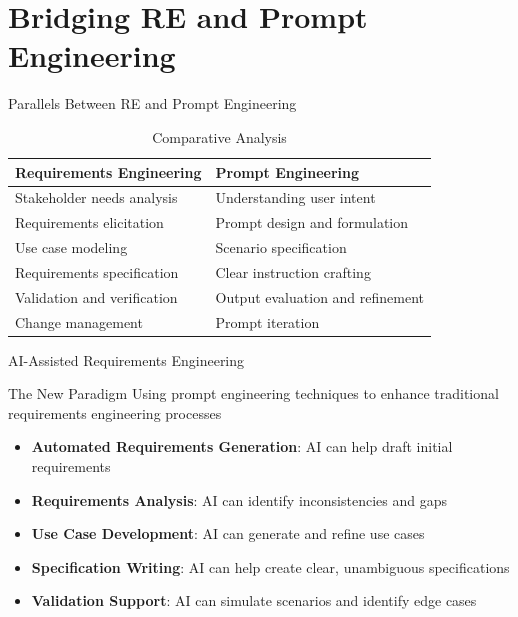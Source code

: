 \documentclass{beamer}
\begin{document}
\section{Bridging RE and Prompt Engineering}

\begin{frame}{Parallels Between RE and Prompt Engineering}
    \begin{table}
        \centering
        \begin{tabular}{p{}|p{}}
            \textbf{Requirements Engineering} & \textbf{Prompt Engineering} \\
            \hline
            Stakeholder needs analysis & Understanding user intent \\
            Requirements elicitation & Prompt design and formulation \\
            Use case modeling & Scenario specification \\
            Requirements specification & Clear instruction crafting \\
            Validation and verification & Output evaluation and refinement \\
            Change management & Prompt iteration \\
        \end{tabular}
        \caption{Comparative Analysis}
    \end{table}
\end{frame}

\begin{frame}{AI-Assisted Requirements Engineering}
    \begin{block}{The New Paradigm}
        Using prompt engineering techniques to enhance traditional requirements engineering processes
    \end{block}
    
    \begin{itemize}
        \item \textbf{Automated Requirements Generation}: AI can help draft initial requirements
        \item \textbf{Requirements Analysis}: AI can identify inconsistencies and gaps
        \item \textbf{Use Case Development}: AI can generate and refine use cases
        \item \textbf{Specification Writing}: AI can help create clear, unambiguous specifications
        \item \textbf{Validation Support}: AI can simulate scenarios and identify edge cases
    \end{itemize}
\end{frame}
\end{document}
